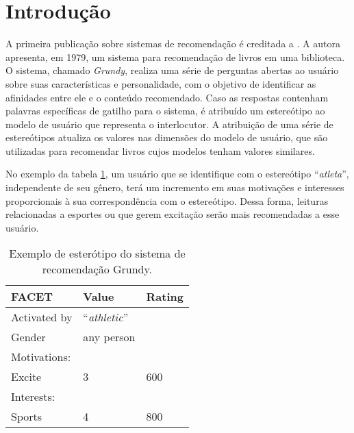 \section{Introdução}

A primeira publicação sobre sistemas de recomendação é creditada a
\citet{rich1979user}. A autora apresenta, em 1979, um sistema para recomendação de livros
em uma biblioteca. O sistema, chamado \textit{Grundy}, realiza uma série de
perguntas abertas ao usuário sobre suas características e personalidade, com o objetivo
de identificar as afinidades entre ele e o conteúdo recomendado. Caso as
respostas contenham palavras específicas de gatilho para o sistema, é atribuído
um estereótipo ao modelo de usuário que representa o interlocutor. A atribuição
de uma série de estereótipos atualiza os valores nas dimensões do modelo de
usuário, que são utilizadas para recomendar livros cujos modelos tenham valores
similares.

No exemplo da tabela \ref{grundy}, um usuário que se identifique com o estereótipo
``\textit{atleta}'', independente de seu gênero, terá um incremento em suas
motivações e interesses proporcionais à sua correspondência com o estereótipo.
Dessa forma, leituras relacionadas a esportes ou que gerem excitação serão
mais recomendadas a esse usuário.

\vspace{2em}

\begin{table}[h!]
\begin{center}
   \begin{tabular}{|m{3cm}|m{2cm}|m{2cm}|}
       \hline
       \textbf{FACET} & \textbf{Value} & \textbf{Rating} \\
       \hline
       Activated by & ``\textit{athletic}'' & \\
       Gender & any person & \\
       \hline
       Motivations: & & \\
       \hspace{1mm} Excite & 3 & 600 \\
       \hline
       Interests: & & \\
       \hspace{1mm} Sports & 4 & 800 \\
       \hline
   \end{tabular}
   \caption{Exemplo de esterótipo do sistema de recomendação Grundy.}
   \label{grundy}
\end{center}
\end{table}

